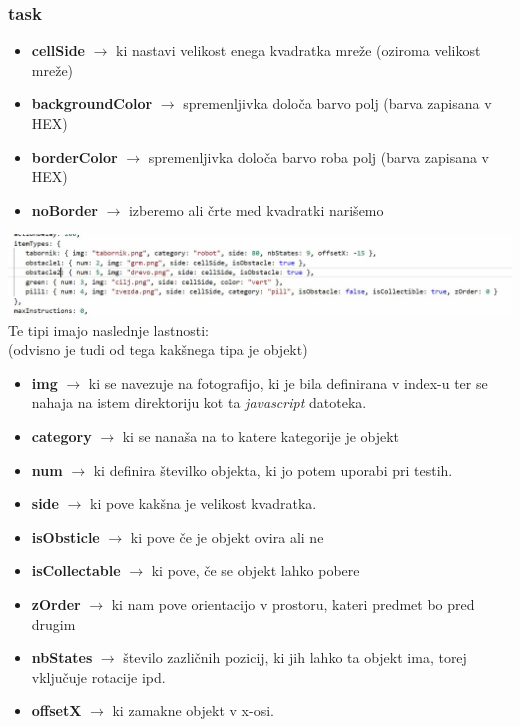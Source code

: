 \documentclass[11pt]{article} %
\begin{document}
\subsubsection{task}
\begin{itemize}
\item \textbf{cellSide} $\rightarrow$ ki nastavi velikost enega kvadratka mreže (oziroma velikost mreže)
\item \textbf{backgroundColor} $\rightarrow$ spremenljivka določa barvo polj (barva zapisana v HEX)
\item \textbf{borderColor} $\rightarrow$ spremenljivka določa barvo roba polj (barva zapisana v HEX)
\item \textbf{noBorder} $\rightarrow$ izberemo ali črte med kvadratki narišemo
\end{itemize}
\includegraphics[scale=0.6]{mreza_task_tipi}\\
Te tipi imajo naslednje lastnosti:\\ (odvisno je tudi od tega kakšnega tipa je objekt)
\begin{itemize}
\item \textbf{img}  $\rightarrow$ ki se navezuje na fotografijo, ki je bila definirana v index-u ter se nahaja na istem direktoriju kot ta \textit{javascript} datoteka.
\item \textbf{category}  $\rightarrow$ ki se nanaša na to katere kategorije je objekt
\item \textbf{num}  $\rightarrow$ ki definira številko objekta, ki jo potem uporabi pri testih.
\item \textbf{side}  $\rightarrow$ ki pove kakšna je velikost kvadratka.
\item \textbf{isObsticle}  $\rightarrow$ ki pove če je objekt ovira ali ne
\item \textbf{isCollectable}  $\rightarrow$ ki pove, če se objekt lahko pobere
\item \textbf{zOrder}  $\rightarrow$ ki nam pove orientacijo v prostoru, kateri predmet bo pred drugim
\item \textbf{nbStates}  $\rightarrow$ število zazličnih pozicij, ki jih lahko ta objekt ima, torej vključuje rotacije ipd.
\item \textbf{offsetX}  $\rightarrow$ ki zamakne objekt v x-osi.
\end{itemize}
\end{document}
